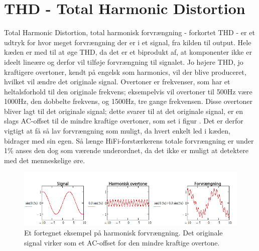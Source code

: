 \section{THD - Total Harmonic Distortion}
\label{thd}
Total Harmonic Distortion, total harmonisk forvrængning - forkortet THD - er et udtryk for hvor meget forvrængning der er i et signal, fra kilden til output.  Hele kæden er med til at øge THD, da det er et biprodukt af, at komponenter ikke er ideelt lineære og derfor vil tilføje forvrængning til signalet. Jo højere THD, jo kraftigere overtoner, kendt på engelsk som harmonics, vil der blive produceret, hvilket vil ændre det originale signal. Overtoner er frekvenser, som har et heltalsforhold til den originale frekvens; eksempelvis vil overtoner til 500Hz være 1000Hz, den dobbelte frekvens, og 1500Hz, tre gange frekvensen. Disse overtoner bliver lagt til det originale signal; dette svarer til at det originale signal, er en slags AC-offset til de mindre kraftige overtoner, som set i figur . Det er derfor vigtigt at få så lav forvrængning som muligt, da hvert enkelt led i kæden, bidrager med sin egen. Så længe HiFi-forstærkerens totale forvrængning er under 1\% anses den dog som værende underordnet, da det ikke er muligt at detektere med det menneskelige øre.

\begin{figure}[h]
\centering
\includegraphics[scale=.75]{indledende_analyse/thd/thd.png}
\caption{Et fortegnet eksempel på harmonisk forvrængning. Det originale signal virker som et AC-offset for den mindre kraftige overtone.}
\label{fig:harmonic_distortion}
\end{figure}
